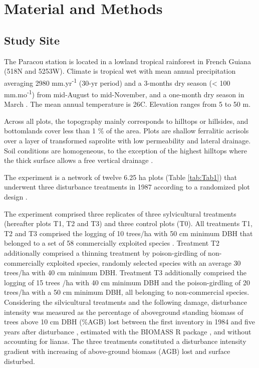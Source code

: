 \documentclass[fleqn,10pt]{ArtEcoFoG} %
\begin{document}
\color{black}

\hypertarget{material-and-methods}{%
\section{Material and Methods}\label{material-and-methods}}

\hypertarget{study-site}{%
\subsection{Study Site}\label{study-site}}

The Paracou station is located in a lowland tropical rainforest in French Guiana (518\textdegree N and 5253\textdegree W).
Climate is tropical wet with mean annual precipitation averaging 2980 mm.yr\textsuperscript{-1} (30-yr period) and a 3-months dry season (\textless{} 100 mm.mo\textsuperscript{-1}) from mid-August to mid-November, and a one-month dry season in March \citep{Wagner2011}.
The mean annual temperature is 26\textdegree C.
Elevation ranges from 5 to 50 m.

\color{red}

Across all plots, the topography mainly corresponds to hilltops or hillsides, and bottomlands cover less than 1 \% of the area.
Plots are shallow ferralitic acrisols over a layer of transformed saprolite with low permeability and lateral drainage.
Soil conditions are homogeneous, to the exception of the highest hilltops where the thick surface allows a free vertical drainage \citep{Gourlet-Fleury2004}.
\color{black}

The experiment is a network of twelve 6.25 ha plots (Table \ref{tab:Tab1}) that underwent three disturbance treatments in 1987 according to a randomized plot design \citep{Herault2018}.

\color{red}

The experiment comprised three replicates of three sylvicultural treatments (hereafter plots T1, T2 and T3) and three control plots (T0).
All treatments T1, T2 and T3 comprised the logging of 10 trees/ha with 50 cm minimum DBH that belonged to a set of 58 commercially exploited species \citep{Gourlet-Fleury2004}.
Treatment T2 additionally comprised a thinning treatment by poison-girdling of non-commercially exploited species, randomly selected species with an average 30 trees/ha with 40 cm minimum DBH.
Treatment T3 additionally comprised the logging of 15 trees /ha with 40 cm minimum DBH and the poison-girdling of 20 trees/ha with a 50 cm minimum DBH, all belonging to non-commercial species.
Considering the silvicultural treatments and the following damage, disturbance intensity was measured as the percentage of aboveground standing biomass of trees above 10 cm DBH (\%AGB) lost between the first inventory in 1984 and five years after disturbance \citep{Piponiot2016}, estimated with the BIOMASS R package \citep{Biomass2018}, and without accounting for lianas.
The three treatments constituted a disturbance intensity gradient with increasing of above-ground biomass (AGB) lost and surface disturbed.
\color{black}
\end{document}
